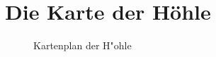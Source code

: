\chapter{Die Karte der Höhle}
\begin{figure}[hbtp]
\begin{center}
\end{center}
\caption{Kartenplan der H"ohle}
\label{kartehoehle}
\end{figure}
